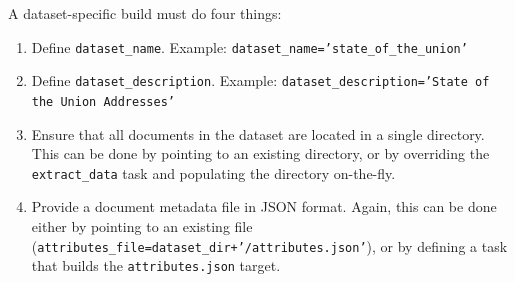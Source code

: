\documentclass[11pt]{article}
\begin{document}
A dataset-specific build must do four things:
\begin{enumerate}
\item Define \texttt{dataset\_name}.
    \newline Example: \texttt{dataset\_name='state\_of\_the\_union'}
  \item Define \texttt{dataset\_description}.
    \newline Example: \texttt{dataset\_description='State of the Union Addresses'}
  \item Ensure that all documents in the dataset are located in a single directory.
    This can be done by pointing to an existing directory, or by overriding the
    \texttt{extract\_data} task and populating the directory on-the-fly.
  \item Provide a document metadata file in JSON format. Again, this can be done
    either by pointing to an existing file (\texttt{attributes\_\allowbreak{}file=\allowbreak{}dataset\_\allowbreak{}dir\allowbreak{}+\allowbreak{}'/attributes\allowbreak{}.json'}), or by defining a task that builds the \texttt{attributes.json} target.
\end{enumerate}



% 
% 
% 
% 
\end{document}
